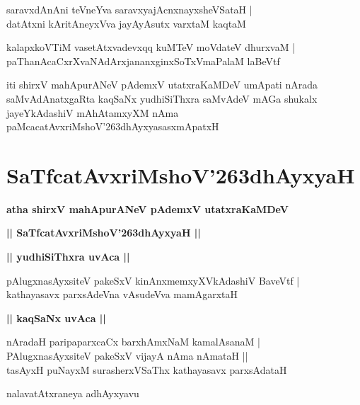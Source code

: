 \documentclass[twoside,12pt,openright]{book}
\def\S{\char'263}
\newcounter{shloka}[chapter]
\def\uvaca#1{\centerline{{\large\textbf{#1}}}}
\begin{document}
\begin{shloka}%
saravxdAnAni teVneYva saravxyajAcnxnayxsheVSataH |\\
datAtxni kAritAneyxVva jayAyAsutx varxtaM kaqtaM 
\end{shloka}

\begin{shloka}%
kalapxkoVTiM vasetAtxvadevxqq kuMTeV moVdateV dhurxvaM |\\
paThanAcaCxrXvaNAdArxjananxginxSoTxVmaPalaM laBeVtf
\end{shloka}

\begin{center}
iti shirxV mahApurANeV pAdemxV utatxraKaMDeV umApati nArada saMvAdAnatxgaRta kaqSaNx yudhiSiThxra 
saMvAdeV mAGa shukalx jayeYkAdashiV mAhAtamxyXM nAma paMcacatAvxriMshoV\S dhAyxyasasxmApatxH
\end{center}

\chapter{SaTfcatAvxriMshoV\S dhAyxyaH}

\begin{center}
{\LARGE\bfseries atha shirxV mahApurANeV pAdemxV utatxraKaMDeV}
\end{center}

\begin{center}
{\LARGE\bfseries || SaTfcatAvxriMshoV\S dhAyxyaH ||}
\end{center}

\uvaca{|| yudhiSiThxra uvAca ||}

\begin{shloka}%
pAlugxnasAyxsiteV pakeSxV kinAnxmemxyXVkAdashiV BaveVtf |\\
kathayasavx parxsAdeVna vAsudeVva mamAgarxtaH 
\end{shloka}

\uvaca{|| kaqSaNx uvAca ||}

\begin{shloka}%
nAradaH paripaparxcaCx barxhAmxNaM kamalAsanaM |\\
PAlugxnasAyxsiteV pakeSxV vijayA nAma nAmataH ||\\
tasAyxH puNayxM surasherxVSaThx kathayasavx parxsAdataH
\end{shloka}

\begin{center}
nalavatAtxraneya adhAyxyavu
\end{center}
\end{document}
